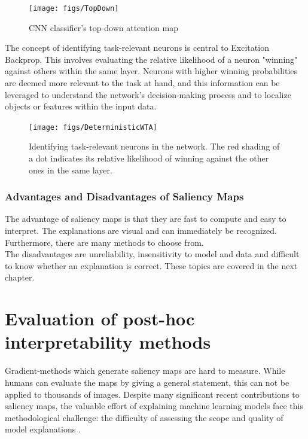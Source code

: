 \begin{figure}[h!]
	\centering
	\texttt{[image: figs/TopDown]}
	\caption[CNN classifier's top-down attention map]{CNN classifier's top-down attention map \cite{zhang2018}}
	\label{fig:topdown}
\end{figure}

The concept of identifying task-relevant neurons is central to Excitation Backprop. This involves evaluating the relative likelihood of a neuron "winning" against others within the same layer. Neurons with higher winning probabilities are deemed more relevant to the task at hand, and this information can be leveraged to understand the network's decision-making process and to localize objects or features within the input data.


\begin{figure}[h!]
	\centering
	\texttt{[image: figs/DeterministicWTA]}
	\caption[Identifying task-relevant neurons in the network.]{Identifying task-relevant neurons in the network. The red shading of a dot indicates its relative likelihood of winning against the other ones in the same layer. \cite{zhang2018}}
	\label{fig:taskrelevant}
\end{figure}

\newpage

\subsection{Advantages and Disadvantages of Saliency Maps \cite{molnar2022}}

The advantage of saliency maps is that they are fast to compute and easy to interpret. The explanations are visual and can immediately be recognized. Furthermore, there are many methods to choose from. 
\\
The disadvantages are unreliability, insensitivity to model and data and difficult to know whether an explanation is correct. These topics are covered in the next chapter.

\chapter{Evaluation of post-hoc interpretability methods}

Gradient-methods which generate saliency maps are hard to measure. While humans can evaluate the maps by giving a general statement, this can not be applied to thousands of images. Despite many significant recent contributions to saliency maps, the valuable effort of explaining machine learning models face this methodological challenge: the difficulty of assessing the scope and quality of model explanations \cite{adebayo2020sanity}.



